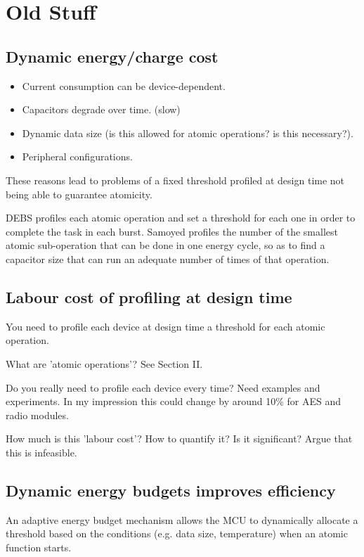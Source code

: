 \section{Old Stuff}

\subsection{Dynamic energy/charge cost}

\begin{itemize}
    \item Current consumption can be device-dependent.
    \item Capacitors degrade over time. (slow)
    \item Dynamic data size (is this allowed for atomic operations? is this necessary?).
    \item Peripheral configurations.
\end{itemize}

These reasons lead to problems of a fixed threshold profiled at design time not being able to guarantee atomicity.

DEBS profiles each atomic operation and set a threshold for each one in order to complete the task in each burst.
Samoyed profiles the number of the smallest atomic sub-operation that can be done in one energy cycle, so as to find a capacitor size that can run an adequate number of times of that operation. 

\subsection{Labour cost of profiling at design time}

You need to profile each device at design time a threshold for each atomic operation.

What are 'atomic operations'?
See Section II.

Do you really need to profile each device every time?
Need examples and experiments. In my impression this could change by around 10\% for AES and radio modules. 

How much is this 'labour cost'? How to quantify it? Is it significant?
Argue that this is infeasible.

\subsection{Dynamic energy budgets improves efficiency}

An adaptive energy budget mechanism allows the MCU to dynamically allocate a threshold based on the conditions (e.g. data size, temperature) when an atomic function starts. 

